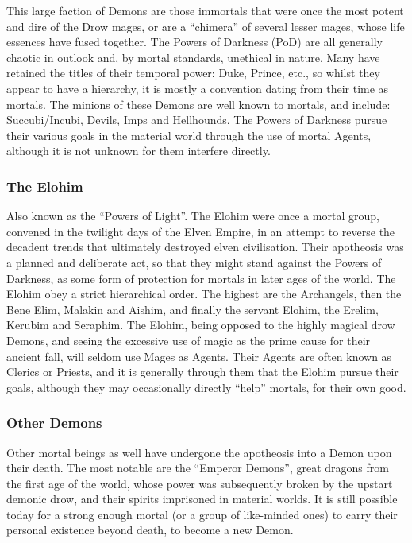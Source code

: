 This large faction of Demons are those immortals that were once the
most potent and dire of the Drow mages, or are a ``chimera'' of several
lesser mages, whose life essences have fused together. The Powers of
Darkness (PoD) are all generally chaotic in outlook and, by mortal
standards, unethical in nature. Many have retained the titles of their
temporal power: Duke, Prince, etc., so whilst they appear to have a
hierarchy, it is mostly a convention dating from their time as
mortals. The minions of these Demons are well known to mortals, and
include: Succubi/Incubi, Devils, Imps and Hellhounds. The Powers of
Darkness pursue their various goals in the material world through the
use of mortal Agents, although it is not unknown for them interfere
directly.

\subsubsection{The Elohim}

Also known as the ``Powers of Light''. The Elohim were once a mortal
group, convened in the twilight days of the Elven Empire, in an
attempt to reverse the decadent trends that ultimately destroyed elven
civilisation. Their apotheosis was a planned and deliberate act, so
that they might stand against the Powers of Darkness, as some form of
protection for mortals in later ages of the world. The Elohim obey a
strict hierarchical order. The highest are the Archangels, then the
Bene Elim, Malakin and Aishim, and finally the servant Elohim, the
Erelim, Kerubim and Seraphim. The Elohim, being opposed to the highly
magical drow Demons, and seeing the excessive use of magic as the
prime cause for their ancient fall, will seldom use Mages as
Agents. Their Agents are often known as Clerics or Priests, and it is
generally through them that the Elohim pursue their goals, although
they may occasionally directly ``help'' mortals, for their own good.

\subsubsection{Other Demons}

Other mortal beings as well have undergone the apotheosis into a Demon
upon their death. The most notable are the ``Emperor Demons'', great
dragons from the first age of the world, whose power was subsequently
broken by the upstart demonic drow, and their spirits imprisoned in
material worlds. It is still possible today for a strong enough mortal
(or a group of like-minded ones) to carry their personal existence
beyond death, to become a new Demon.

